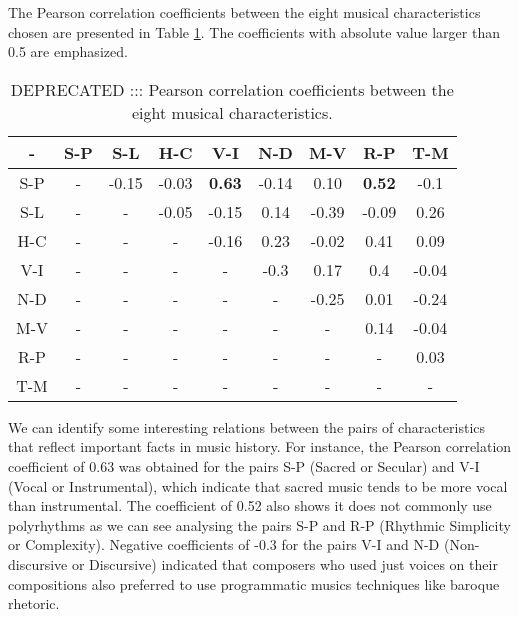 \documentclass[
 aip,
 jmp,
 amsmath,amssymb,
 reprint,
]{revtex4-1}
\begin{document}
The Pearson correlation coefficients between the eight musical
characteristics chosen are presented in Table \ref{tab:tableB}.
The coefficients with absolute value larger than 0.5 are emphasized.

\begin{table}[ht]
\caption{\label{tab:tableB} DEPRECATED ::: Pearson correlation coefficients between
  the eight musical characteristics.}

\begin{ruledtabular}
\begin{tabular}{|c||c|c|c|c|c|c|c|c|}

-   &  S-P  &  S-L  &  H-C    &  V-I   &  N-D    &  M-V           &  R-P            &  T-M  \\ \hline
S-P & -     &  -0.15 &  -0.03 &  \textbf{0.63}  &  -0.14  &  0.10   &  \textbf{0.52}   &  -0.1 \\
S-L & -     &  -     &  -0.05 &  -0.15 &  0.14  &  -0.39  &  -0.09  &  0.26 \\
H-C & -     &  -     &  -     &  -0.16 &  0.23  &  -0.02  &  0.41   &  0.09 \\
V-I & -     &  -     &  -     &  -     &  -0.3 &  0.17   &  0.4   &  -0.04 \\
N-D & -     &  -     &  -     &  -     &  -     &  -0.25  &  0.01  &  -0.24 \\
M-V & -     &  -     &  -     &  -     &  -     &  -      &  0.14   &  -0.04 \\
R-P & -     &  -     &  -     &  -     &  -     &  -      &  -      &  0.03 \\
T-M & -     &  -     &  -     &  -     &  -     &  -      &  -      &  - \\

\end{tabular}
\end{ruledtabular}
\end{table}

We can identify some interesting relations between the pairs of
characteristics that reflect important facts in music history. For
instance, the Pearson correlation coefficient of 0.63 was obtained for
the pairs S-P (Sacred or Secular) and V-I (Vocal or Instrumental),
which indicate that sacred music tends to be more vocal than
instrumental. The coefficient of 0.52 also shows it does not commonly use polyrhythms as we can see
analysing the pairs S-P and R-P (Rhythmic Simplicity or Complexity).
Negative coefficients of -0.3 for the pairs V-I and N-D
(Non-discursive or Discursive) indicated that composers who used
just voices on their compositions also preferred to use programmatic
musics techniques like baroque rhetoric.
\end{document}
